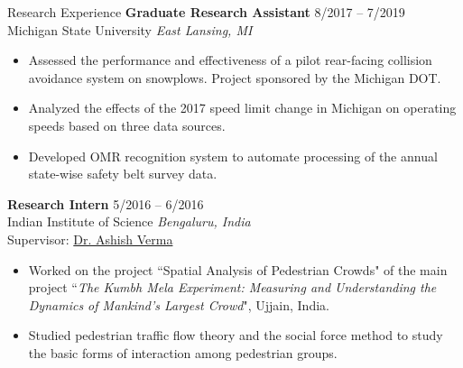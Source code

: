 \documentclass{CV} %
\begin{document}
\begin{rSection}{Research Experience}
    {\bf Graduate Research Assistant} \hfill {8/2017 – 7/2019}
    \\ Michigan State University \hfill {\em East Lansing, MI}
    \begin{itemize}[noitemsep]
        \item Assessed the performance and effectiveness of a pilot rear-facing collision avoidance system on snowplows. Project sponsored by the Michigan DOT.
        \item Analyzed the effects of the 2017 speed limit change in Michigan on operating speeds based on three data sources.
        \item Developed OMR recognition system to automate processing of the annual state-wise safety belt survey data.
    \end{itemize}
    
    {\bf Research Intern} \hfill {5/2016 – 6/2016}
    \\ Indian Institute of Science \hfill {\em Bengaluru, India}
    \\ Supervisor: \href{http://civil.iisc.ernet.in/~ashishv/}{Dr. Ashish Verma}
    \begin{itemize}[noitemsep]
        \item Worked on the project ``Spatial Analysis of Pedestrian Crowds" of the main project ``\textit{The Kumbh Mela Experiment: Measuring and Understanding the Dynamics of Mankind’s Largest Crowd}", Ujjain, India.
        \item Studied pedestrian traffic flow theory and the social force method to study the basic forms of interaction among pedestrian groups.
    \end{itemize}
\end{rSection}
\end{document}
